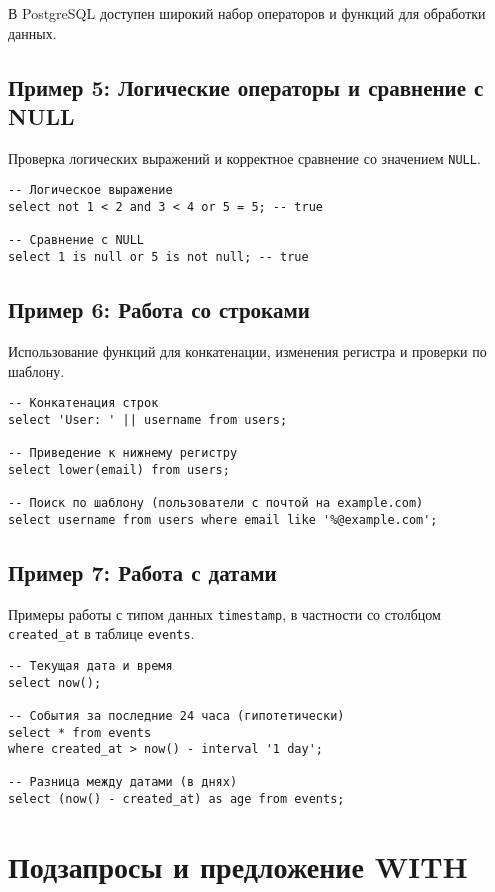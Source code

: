 \documentclass[oneside,a4paper,14pt]{extarticle}
\begin{document}
В PostgreSQL доступен широкий набор операторов и функций для обработки данных.

\subsection*{Пример 5: Логические операторы и сравнение с NULL}

Проверка логических выражений и корректное сравнение со значением \texttt{NULL}.

\begin{verbatim}
-- Логическое выражение
select not 1 < 2 and 3 < 4 or 5 = 5; -- true

-- Сравнение с NULL
select 1 is null or 5 is not null; -- true
\end{verbatim}

\subsection*{Пример 6: Работа со строками}

Использование функций для конкатенации, изменения регистра и проверки по шаблону.

\begin{verbatim}
-- Конкатенация строк
select 'User: ' || username from users;

-- Приведение к нижнему регистру
select lower(email) from users;

-- Поиск по шаблону (пользователи с почтой на example.com)
select username from users where email like '%@example.com';
\end{verbatim}

\subsection*{Пример 7: Работа с датами}

Примеры работы с типом данных \texttt{timestamp}, в частности со столбцом \texttt{created\_at} в таблице \texttt{events}.

\begin{verbatim}
-- Текущая дата и время
select now();

-- События за последние 24 часа (гипотетически)
select * from events 
where created_at > now() - interval '1 day';

-- Разница между датами (в днях)
select (now() - created_at) as age from events;
\end{verbatim}

\section*{Подзапросы и предложение WITH}
\end{document}
